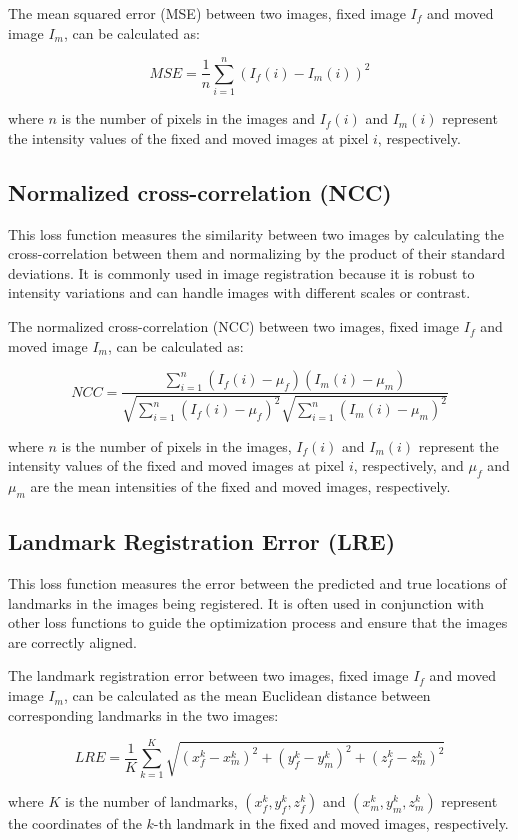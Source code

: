 \documentclass{report}
\begin{document}
	The mean squared error (MSE) between two images, fixed image $I_f$ and moved image $I_m$, can be calculated as:
	
	$$ MSE = \frac{1}{n} \sum_{i=1}^n (I_f(i) - I_m(i))^2 $$
	
	where $n$ is the number of pixels in the images and $I_f(i)$ and $I_m(i)$ represent the intensity values of the fixed and moved images at pixel $i$, respectively.
	
	\subsection{Normalized cross-correlation (NCC)}
	This loss function measures the similarity between two images by calculating the cross-correlation between them and normalizing by the product of their standard deviations. It is commonly used in image registration because it is robust to intensity variations and can handle images with different scales or contrast.
	
	
	The normalized cross-correlation (NCC) between two images, fixed image $I_f$ and moved image $I_m$, can be calculated as:
	
	$$ NCC = \frac{\sum_{i=1}^n (I_f(i) - \mu_f)(I_m(i) - \mu_m)}{\sqrt{\sum_{i=1}^n (I_f(i) - \mu_f)^2}\sqrt{\sum_{i=1}^n (I_m(i) - \mu_m)^2}} $$
	
	where $n$ is the number of pixels in the images, $I_f(i)$ and $I_m(i)$ represent the intensity values of the fixed and moved images at pixel $i$, respectively, and $\mu_f$ and $\mu_m$ are the mean intensities of the fixed and moved images, respectively.
	
	\subsection{Landmark Registration Error (LRE)}
	This loss function measures the error between the predicted and true locations of landmarks in the images being registered. It is often used in conjunction with other loss functions to guide the optimization process and ensure that the images are correctly aligned.
	
	The landmark registration error between two images, fixed image $I_f$ and moved image $I_m$, can be calculated as the mean Euclidean distance between corresponding landmarks in the two images:
	
	$$ LRE = \frac{1}{K} \sum_{k=1}^K \sqrt{(x_f^k - x_m^k)^2 + (y_f^k - y_m^k)^2 + (z_f^k - z_m^k)^2} $$
	
	where $K$ is the number of landmarks, $(x_f^k, y_f^k, z_f^k)$ and $(x_m^k, y_m^k, z_m^k)$ represent the coordinates of the $k$-th landmark in the fixed and moved images, respectively.
	
\end{document}
